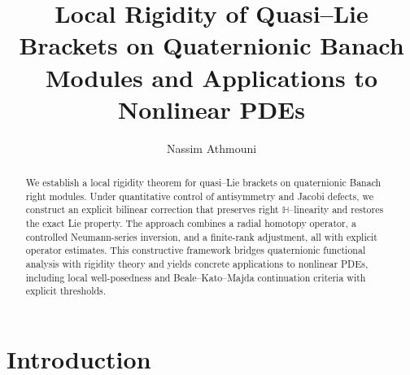 \documentclass[10pt]{amsart}
\numberwithin{equation}{section}
\theoremstyle{remark}
\theoremstyle{definition}
\begin{document}
\title[Local rigidity on quaternionic Banach modules]
{Local Rigidity of Quasi--Lie Brackets on Quaternionic Banach Modules and Applications to Nonlinear PDEs}

\author{Nassim Athmouni}
\address{University of Gafsa, University Campus 2112, Tunisia}


\begin{abstract}
We establish a local rigidity theorem for quasi--Lie brackets on quaternionic Banach right modules. Under quantitative control of antisymmetry and Jacobi defects, we construct an explicit bilinear correction that preserves right $\mathbb{H}$--linearity and restores the exact Lie property. The approach combines a radial homotopy operator, a controlled Neumann-series inversion, and a finite-rank adjustment, all with explicit operator estimates. This constructive framework bridges quaternionic functional analysis with rigidity theory and yields concrete applications to nonlinear PDEs, including local well-posedness and Beale--Kato--Majda continuation criteria with explicit thresholds.
\end{abstract}




\maketitle
\tableofcontents


\section{Introduction}
\end{document}
